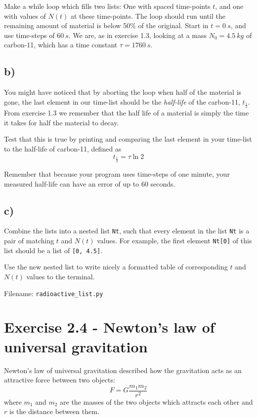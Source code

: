 \documentclass[10pt,a4paper]{article}
\newcommand{\halflife}{t_{\frac{1}{2}}}
\begin{document}
Make a while loop which fills two lists: One with spaced time-points $t$, and one with values of $N(t)$ at these time-points. The loop should run until the remaining amount of material is below 50\% of the original. Start in $t=\SI{0}{s}$, and use time-steps of $\SI{60}{s}$. We are, as in exercise 1.3, looking at a mass $N_0 = \SI{4.5}{kg}$ of carbon-11, which has a time constant $\tau = \SI{1760}{s}$.


\subsection*{b)}
You might have noticed that by aborting the loop when half of the material is gone, the last element in our time-list should be the \textit{half-life} of the carbon-11, $\halflife$. From exercise 1.3 we remember that the half life of a material is simply the time it takes for half the material to decay.

Test that this is true by printing and comparing the last element in your time-list to the half-life of carbon-11, defined as
\[	\halflife = \tau \ln 2
\]

Remember that because your program uses time-steps of one minute, your measured half-life can have an error of up to 60 seconds.


\subsection*{c)}
Combine the lists into a nested list \texttt{Nt}, such that every element in the list \texttt{Nt} is a pair of matching $t$ and $N(t)$ values. For example, the first element \texttt{Nt[0]} of this list should be a list of \texttt{[0,\ 4.5]}.

Use the new nested list to write nicely a formatted table of corresponding $t$ and $N(t)$ values to the terminal.

Filename: \texttt{radioactive\_list.py}


	\section*{Exercise 2.4 - Newton's law of universal gravitation}

	Newton's law of universal gravitation described how the gravitation acts as an attractive force between two objects:
	\begin{equation*}
		F = G\frac{m_1m_2}{r^2}
	\end{equation*}
	where $m_1$ and $m_2$ are the masses of the two objects which attracts each other and $r$ is the distance between them. 
	
\end{document}
